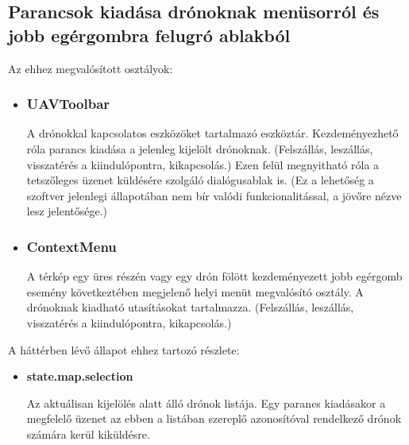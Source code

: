 \subsection{Parancsok kiadása drónoknak menüsorról és jobb egérgombra felugró ablakból}

\noindent Az ehhez megvalósított osztályok:
\begin{itemize}


\item\subsubsection{UAVToolbar}
A drónokkal kapcsolatos eszközöket tartalmazó eszköztár. Kezdeményezhető róla
parancs kiadása a jelenleg kijelölt drónoknak. (Felszállás, leszállás,
visszatérés a kiindulópontra, kikapcsolás.) Ezen felül megnyitható róla a
tetszőleges üzenet küldésére szolgáló dialógusablak is. (Ez a lehetőség a
szoftver jelenlegi állapotában nem bír valódi funkcionalitással, a jövőre nézve
lesz jelentősége.)

\item\subsubsection{ContextMenu}
A térkép egy üres részén vagy egy drón fölött kezdeményezett jobb egérgomb
esemény következtében megjelenő helyi menüt megvalósító osztály. A drónoknak
kiadható utasításokat tartalmazza. (Felszállás, leszállás, visszatérés a
kiindulópontra, kikapcsolás.)

\end{itemize}

\noindent A háttérben lévő állapot ehhez tartozó részlete:
\begin{itemize}

  \item \textbf{state.map.selection}

  Az aktuálisan kijelölés alatt álló drónok listája. Egy parancs kiadásakor a
  megfelelő üzenet az ebben a listában szereplő azonosítóval rendelkező drónok
  számára kerül kiküldésre.

\end{itemize}

